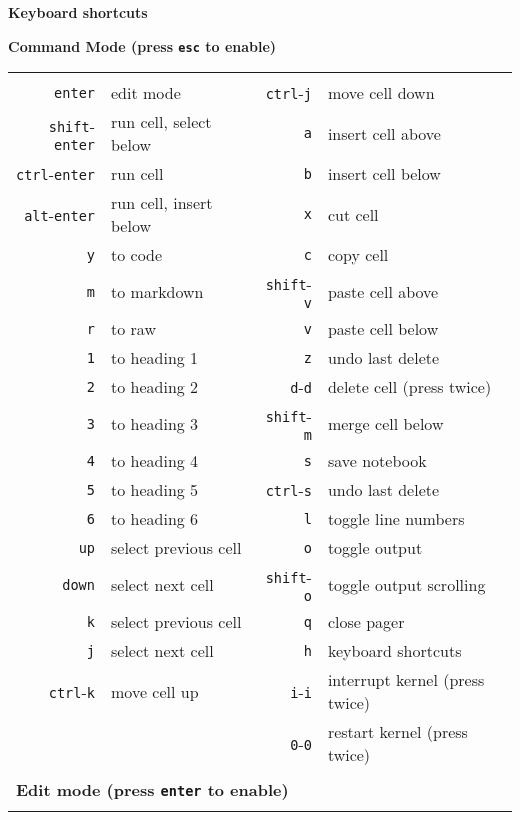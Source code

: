 \documentclass[letterpaper,12pt,oneside]{article}
\begin{document}
% 
\begin{center}
\textbf{\large Keyboard shortcuts}
\end{center}

\textbf{Command Mode (press {\tt esc} to enable)}

\begin{tabular}{rlrl}
&&&\\
{\tt enter} &edit mode & {\tt ctrl}-{\tt j} & move cell down\\     
{\tt shift}-{\tt enter} & run cell, select below & {\tt a} & insert cell above \\
{\tt ctrl}-{\tt enter} & run cell & {\tt b} & insert cell below \\
{\tt alt}-{\tt enter}& run cell, insert below & {\tt x} & cut cell \\
{\tt y} & to code& {\tt c} & copy cell \\
{\tt m} & to markdown & {\tt shift}-{\tt v} & paste cell above  \\
{\tt r} & to raw & {\tt v} & paste cell below\\
{\tt 1} & to heading 1 & {\tt z} & undo last delete \\
{\tt 2} & to heading 2 & {\tt d}-{\tt d} & delete cell (press twice) \\
{\tt 3} & to heading 3 & {\tt shift}-{\tt m} & merge cell below \\
{\tt 4} & to heading 4 & {\tt s} & save notebook \\
{\tt 5} & to heading 5 & {\tt ctrl}-{\tt s} & undo last delete \\
{\tt 6} & to heading 6 & {\tt l} & toggle line numbers \\
{\tt up} & select previous cell & {\tt o} & toggle output \\
{\tt down} & select next cell & {\tt shift}-{\tt o} & toggle output scrolling \\
{\tt k} & select previous cell & {\tt q} & close pager \\
{\tt j} & select next cell & {\tt h} & keyboard shortcuts \\
 {\tt ctrl}-{\tt k} & move cell up& {\tt i}-{\tt i} & interrupt kernel (press twice) \\
 & & {\tt 0}-{\tt 0} & restart kernel (press twice) \\   

&&&\\
\multicolumn{4}{l}{\textbf{Edit mode (press {\tt enter} to enable)}} \\
&&&\\


\end{tabular}
\end{document}
